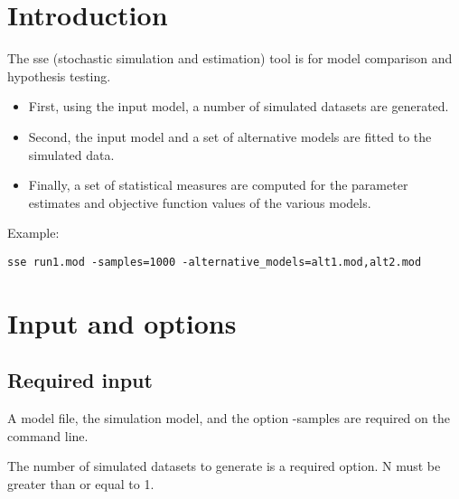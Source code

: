 
\usepackage{hyperref}


\maketitle
\newcommand{\guidetoolname}{sse}
\tableofcontents
\newpage

\section{Introduction}
The sse (stochastic simulation and estimation) tool is for model comparison and hypothesis testing.
\begin{itemize}
\item First, using the input model, a number of simulated datasets are generated.
\item Second, the input model and a set of alternative models are fitted to the simulated data.
\item Finally, a set of statistical measures are computed for the parameter estimates and objective function values of the various models.
\end{itemize}
Example:
\begin{verbatim}
sse run1.mod -samples=1000 -alternative_models=alt1.mod,alt2.mod
\end{verbatim}

\section{Input and options}
\subsection{Required input}
A model file, the simulation model, and the option -samples are required on the command line.
\begin{optionlist}
The number of simulated datasets to generate is a required option. N must be greater than or equal to 1. 
\nextopt
\end{optionlist}
